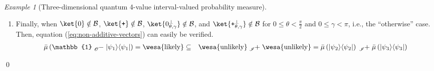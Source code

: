 \documentclass{article}
\theoremstyle{remark}
\newtheorem{example}{Example}
\newcommand{\ps}{\texttt{+}}
\newcommand{\likely}{{\mbox{\wesa{likely}}}}
\newcommand{\unlikely}{{\mbox{\wesa{unlikely}}}}
\newcommand{\rme}{\mathrm{e}}
\newcommand{\rmi}{\mathrm{i}}
\newcommand{\op}[2]{\ensuremath{\left\vert{#1}\middle\rangle\middle\langle{#2}\right\vert}}
\newcommand{\proj}[1]{\op{#1}{#1}}
\begin{document}
\begin{example}[Three-dimensional quantum 4-value interval-valued
probability measure]
\begin{enumerate}
\[\begin{pmatrix}
\cos\left(\frac{\pi}{2}-\theta\right)
\end{pmatrix}=\rme^{-\rmi\gamma}\ket{\ps_{\frac{\pi}{2}-\theta,\pi+\gamma}^{\perp}}
\]
Because of $0\le\theta<\frac{\pi}{2}$ and $0\le\gamma<\pi$, we have
($0<\theta'=\frac{\pi}{2}-\theta<\frac{\pi}{2}$ and $\pi\le\gamma'=\pi+\gamma<2\pi$)
or $\theta'=\frac{\pi}{2}-\theta=\frac{\pi}{2}$. Similarly, when
$\ket{\psi_{1}}$ is $\ket{\ps_{\theta,\gamma}^{\perp}}$ and $\ket{\ps}\notin\mathcal{B}$,
equation (\ref{eq:non-additive-vectors}) holds. 
\item Finally, when $\ket{0}\notin\mathcal{B}$, $\ket{\ps}\notin\mathcal{B}$,
$\ket{0_{\theta,\gamma}^{\perp}}\notin\mathcal{B}$, and $\ket{\ps_{\theta,\gamma}^{\perp}}\notin\mathcal{B}$
for $0\le\theta<\frac{\pi}{2}$ and $0\le\gamma<\pi$, i.e., the ``otherwise''
case. Then, equation (\ref{eq:non-additive-vectors}) can easily be
verified. 
\begin{eqnarray*}
\bar{\mu}\left(\mathbb{1}\tensor*[_{\mathscr{O}}]{-}{}\proj{\psi_{1}}\right)=\likely & \subseteq & \unlikely\tensor*[_{\mathscr{I}}]{+}{}\unlikely=\bar{\mu}\left(\proj{\psi_{2}}\right)\tensor*[_{\mathscr{I}}]{+}{}\bar{\mu}\left(\proj{\psi_{3}}\right)
\end{eqnarray*}
\end{enumerate}
\qed\end{example}


\begin{comment}


\end{comment}

\printbibliography
\end{document}

